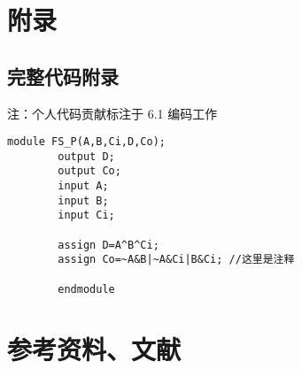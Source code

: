 
\section{附录}

\subsection{完整代码附录}
注：个人代码贡献标注于 6.1 编码工作
  \begin{lstlisting}[style=verilog, title=\texttt{示例}, basicstyle=\zihao{-4}\ttfamily]
		module FS_P(A,B,Ci,D,Co);
		output D;
		output Co;
		input A;
		input B;
		input Ci;
	
		assign D=A^B^Ci;
		assign Co=~A&B|~A&Ci|B&Ci; //这里是注释

		endmodule	
	\end{lstlisting}
\section{参考资料、文献}
